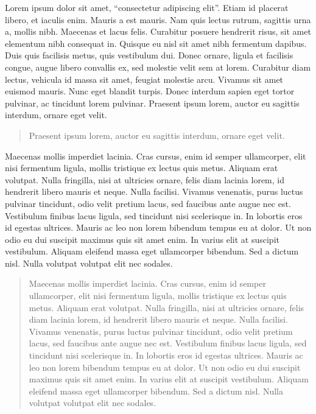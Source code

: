 Lorem ipsum dolor sit amet, \enquote{consectetur adipiscing elit}. Etiam id placerat libero, et iaculis enim. Mauris a est mauris. Nam quis lectus rutrum, sagittis urna a, mollis nibh. Maecenas et lacus felis. Curabitur posuere hendrerit risus, sit amet elementum nibh consequat in. Quisque eu nisl sit amet nibh fermentum dapibus. Duis quis facilisis metus, quis vestibulum dui. Donec ornare, ligula et facilisis congue, augue libero convallis ex, sed molestie velit sem at lorem. Curabitur diam lectus, vehicula id massa sit amet, feugiat molestie arcu. Vivamus sit amet euismod mauris. Nunc eget blandit turpis. Donec interdum sapien eget tortor pulvinar, ac tincidunt lorem pulvinar. Praesent ipsum lorem, auctor eu sagittis interdum, ornare eget velit.
\\

\begin{quote}
	Praesent ipsum lorem, auctor eu sagittis interdum, ornare eget velit.
\end{quote}

Maecenas mollis imperdiet lacinia. Cras cursus, enim id semper ullamcorper, elit nisi fermentum ligula, mollis tristique ex lectus quis metus. Aliquam erat volutpat. Nulla fringilla, nisi at ultricies ornare, felis diam lacinia lorem, id hendrerit libero mauris et neque. Nulla facilisi. Vivamus venenatis, purus luctus pulvinar tincidunt, odio velit pretium lacus, sed faucibus ante augue nec est. Vestibulum finibus lacus ligula, sed tincidunt nisi scelerisque in. In lobortis eros id egestas ultrices. Mauris ac leo non lorem bibendum tempus eu at dolor. Ut non odio eu dui suscipit maximus quis sit amet enim. In varius elit at suscipit vestibulum. Aliquam eleifend massa eget ullamcorper bibendum. Sed a dictum nisl. Nulla volutpat volutpat elit nec sodales.
\\

\begin{quotation}
	Maecenas mollis imperdiet lacinia. Cras cursus, enim id semper ullamcorper, elit nisi fermentum ligula, mollis tristique ex lectus quis metus. Aliquam erat volutpat. Nulla fringilla, nisi at ultricies ornare, felis diam lacinia lorem, id hendrerit libero mauris et neque. Nulla facilisi. Vivamus venenatis, purus luctus pulvinar tincidunt, odio velit pretium lacus, sed faucibus ante augue nec est. Vestibulum finibus lacus ligula, sed tincidunt nisi scelerisque in. In lobortis eros id egestas ultrices. Mauris ac leo non lorem bibendum tempus eu at dolor. Ut non odio eu dui suscipit maximus quis sit amet enim. In varius elit at suscipit vestibulum. Aliquam eleifend massa eget ullamcorper bibendum. Sed a dictum nisl. Nulla volutpat volutpat elit nec sodales.
\end{quotation}

